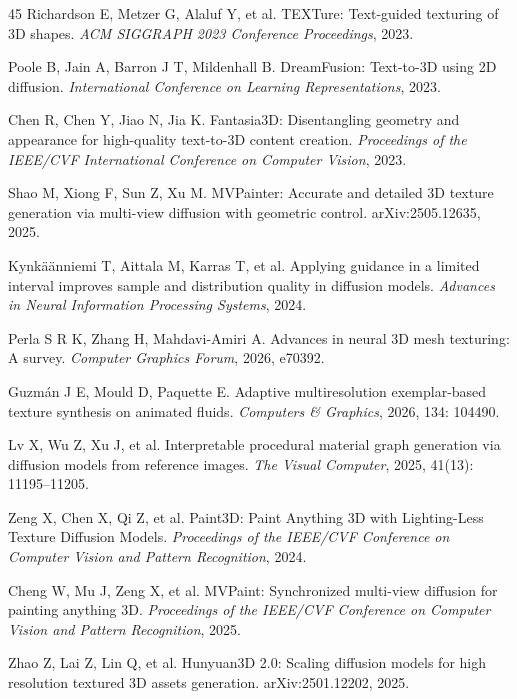 \documentclass[times,twocolumn,final]{elsarticle}
\begin{document}
\begin{thebibliography}{45}
Richardson E, Metzer G, Alaluf Y, et al. TEXTure: Text-guided texturing of 3D shapes. \textit{ACM SIGGRAPH 2023 Conference Proceedings}, 2023.

Poole B, Jain A, Barron J T, Mildenhall B. DreamFusion: Text-to-3D using 2D diffusion. \textit{International Conference on Learning Representations}, 2023.

Chen R, Chen Y, Jiao N, Jia K. Fantasia3D: Disentangling geometry and appearance for high-quality text-to-3D content creation. \textit{Proceedings of the IEEE/CVF International Conference on Computer Vision}, 2023.

Shao M, Xiong F, Sun Z, Xu M. MVPainter: Accurate and detailed 3D texture generation via multi-view diffusion with geometric control. arXiv:2505.12635, 2025.

Kynk\"a\"anniemi T, Aittala M, Karras T, et al. Applying guidance in a limited interval improves sample and distribution quality in diffusion models. \textit{Advances in Neural Information Processing Systems}, 2024.

Perla S R K, Zhang H, Mahdavi-Amiri A. Advances in neural 3D mesh texturing: A survey. \textit{Computer Graphics Forum}, 2026, e70392.

Guzm\'an J E, Mould D, Paquette E. Adaptive multiresolution exemplar-based texture synthesis on animated fluids. \textit{Computers \& Graphics}, 2026, 134: 104490.

Lv X, Wu Z, Xu J, et al. Interpretable procedural material graph generation via diffusion models from reference images. \textit{The Visual Computer}, 2025, 41(13): 11195--11205.

Zeng X, Chen X, Qi Z, et al. Paint3D: Paint Anything 3D with Lighting-Less Texture Diffusion Models. \textit{Proceedings of the IEEE/CVF Conference on Computer Vision and Pattern Recognition}, 2024.

Cheng W, Mu J, Zeng X, et al. MVPaint: Synchronized multi-view diffusion for painting anything 3D. \textit{Proceedings of the IEEE/CVF Conference on Computer Vision and Pattern Recognition}, 2025.

Zhao Z, Lai Z, Lin Q, et al. Hunyuan3D 2.0: Scaling diffusion models for high resolution textured 3D assets generation. arXiv:2501.12202, 2025.


\end{thebibliography}
\end{document}
